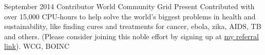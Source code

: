%
%
%

\begin{volunteers}
    \volunteer
        {September 2014}
        {Contributor}
        {World Community Grid}
        {Present}
        {
            Contributed with over 15,000 CPU-hours to help solve the world's 
            biggest problems in health and sustainability, like finding cures 
            and treatments for cancer, ebola, zika, AIDS, TB and others. 
            (Please consider joining this noble effort by signing up at 
            \href{https://join.worldcommunitygrid.org?recruiterId=946192}{my 
            referral link}).
        }
        {
            WCG,
            BOINC
        }
    \emptySeparator
\end{volunteers}
